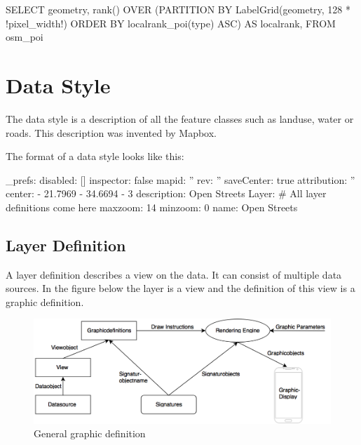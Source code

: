 \begin{sqlcode}
SELECT
  geometry,
  rank() OVER (PARTITION BY LabelGrid(geometry, 128 * !pixel_width!)
               ORDER BY localrank_poi(type) ASC) AS localrank,
FROM osm_poi
\end{sqlcode}

\section{Data Style}\label{data_style}

The data style is a description of all the feature classes such as landuse, water or roads. This description was invented by Mapbox.

The format of a data style looks like this:
\begin{yamlcode}
_prefs: 
  disabled: []
  inspector: false
  mapid: ''
  rev: ''
  saveCenter: true
attribution: ''
center: 
  - 21.7969
  - 34.6694
  - 3
description: Open Streets
Layer: 
    # All layer definitions come here
maxzoom: 14
minzoom: 0
name: Open Streets
\end{yamlcode}

\subsection{Layer Definition}\label{layer_definition}
A layer definition describes a view on the data. It can consist of multiple data sources. In the figure below the layer is a view and the definition of this view is a graphic definition.

\begin{figure}[h]
  \centering
  \includegraphics[width=1\textwidth]{images/graphic_definition.png}
  \caption{General graphic definition}
\end{figure}

